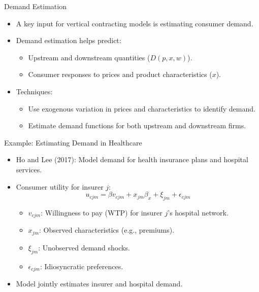\documentclass[aspectratio=169]{beamer}  %
\begin{document}
\begin{frame}{Demand Estimation}
    \begin{itemize}
        \item A key input for vertical contracting models is estimating consumer demand.
        \item Demand estimation helps predict:
        \begin{itemize}
            \item Upstream and downstream quantities (\(D(p, x, w)\)).
            \item Consumer responses to prices and product characteristics (\(x\)).
        \end{itemize}
        \item Techniques:
        \begin{itemize}
            \item Use exogenous variation in prices and characteristics to identify demand.
            \item Estimate demand functions for both upstream and downstream firms.
        \end{itemize}
    \end{itemize}
\end{frame}

\begin{frame}{Example: Estimating Demand in Healthcare}
    \begin{itemize}
        \item Ho and Lee (2017): Model demand for health insurance plans and hospital services.
        \item Consumer utility for insurer \(j\):
        \[
        u_{cjm} = \beta v_{cjm} + x_{jm} \beta_x + \xi_{jm} + \epsilon_{cjm}
        \]
        \begin{itemize}
            \item \(v_{cjm}\): Willingness to pay (WTP) for insurer \(j\)'s hospital network.
            \item \(x_{jm}\): Observed characteristics (e.g., premiums).
            \item \(\xi_{jm}\): Unobserved demand shocks.
            \item \(\epsilon_{cjm}\): Idiosyncratic preferences.
        \end{itemize}
        \item Model jointly estimates insurer and hospital demand.
    \end{itemize}
\end{frame}
\end{document}
